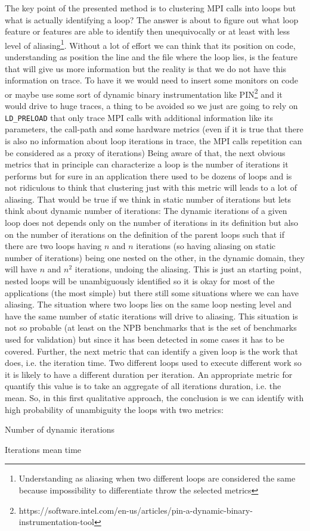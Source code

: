 The key point of the presented method is to clustering MPI calls into loops but
what is actually identifying a loop? The answer is about to figure out what loop
feature or features are able to identify then unequivocally or at least with
less level of aliasing\footnote{Understanding as aliasing when two different
loops are considered the same because impossibility to differentiate throw the
selected metrics}. Without a lot of 
effort we can think that its
position on code, understanding as position the line and the file where the loop
lies, is the feature that will give us more information but the reality is that 
we do not have this information on trace. To have it we would need to insert
some monitors on code or maybe use some sort of dynamic binary instrumentation
like
PIN\footnote{https://software.intel.com/en-us/articles/pin-a-dynamic-binary-instrumentation-tool}
and it would drive to huge traces, a thing to be avoided so we just are going to
rely on {\tt LD\_PRELOAD} that only trace MPI calls with additional
information like its parameters, the call-path and some hardware metrics (even
if it is true that there is also no information about loop iterations in trace,
the MPI calls repetition can be considered as a proxy of iterations)
Being aware of that, the next obvious metrics that in principle can characterize 
a loop is the number of iterations it performs but for sure in an application 
there used to be dozens of
loops and is not ridiculous to think that clustering just with this metric will
leads to a lot of aliasing. That would be true if we think in static number of
iterations but lets think about dynamic number of iterations: The dynamic
iterations of a given loop does not depends only on the number of iterations in
its definition but also on the number of iterations on the definition of the
parent loops such that if there are two loops having $n$ and $n$ iterations (so
having aliasing on static number of iterations) being one nested on the other, 
in the dynamic domain, they will have $n$ and $n^2$ iterations, undoing the aliasing.
This is just an starting point, nested loops will be unambiguously identified so
it is okay for most of the applications (the most simple) but there still some
situations where we can have aliasing. The situation where two loops
lies on the same loop nesting level and have the same number of static
iterations will drive to aliasing. This situation is not so probable (at least
on the NPB benchmarks that is the set of benchmarks used for validation) but
since it has been detected in some cases it has to be covered. Further, the next
metric that can identify a given loop is the work that does, i.e. the
iteration time. Two different loops used to execute different work so it is
likely to have a different duration per iteration. An appropriate metric for
quantify this value is to take an aggregate of all iterations duration, i.e.
the mean. So, in this first qualitative approach, the conclusion is we can 
identify with high probability of 
unambiguity the loops with two metrics:
\begin{enumerate*}[label=\roman*)] 
  \item Number of dynamic iterations
  \item Iterations mean time
\end{enumerate*}

